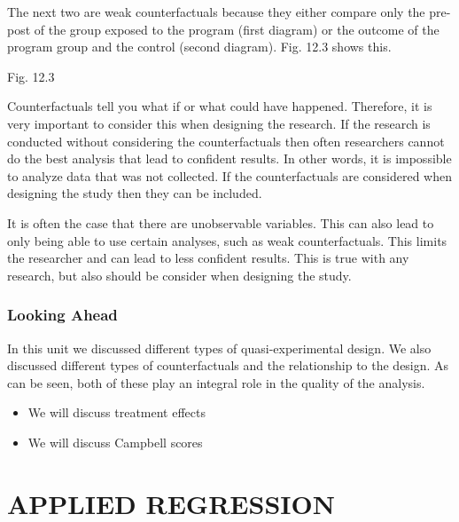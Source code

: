 \documentclass[]{book}
\theoremstyle{definition}
\theoremstyle{definition}
\theoremstyle{definition}
\theoremstyle{remark}
\begin{document}
The next two are weak counterfactuals because they either compare only
the pre-post of the group exposed to the program (first diagram) or the
outcome of the program group and the control (second diagram). Fig. 12.3
shows this.

Fig. 12.3

Counterfactuals tell you what if or what could have happened. Therefore,
it is very important to consider this when designing the research. If
the research is conducted without considering the counterfactuals then
often researchers cannot do the best analysis that lead to confident
results. In other words, it is impossible to analyze data that was not
collected. If the counterfactuals are considered when designing the
study then they can be included.

It is often the case that there are unobservable variables. This can
also lead to only being able to use certain analyses, such as weak
counterfactuals. This limits the researcher and can lead to less
confident results. This is true with any research, but also should be
consider when designing the study.

\hypertarget{looking-ahead-13}{%
\section{Looking Ahead}\label{looking-ahead-13}}

In this unit we discussed different types of quasi-experimental design.
We also discussed different types of counterfactuals and the
relationship to the design. As can be seen, both of these play an
integral role in the quality of the analysis.

\begin{itemize}
\item
  We will discuss treatment effects
\item
  We will discuss Campbell scores
\end{itemize}

\hypertarget{part-applied-regression}{%
\part{APPLIED REGRESSION}\label{part-applied-regression}}
\end{document}
